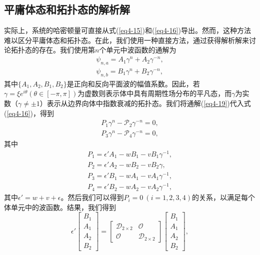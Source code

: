 \subsection{平庸体态和拓扑态的解析解}

实际上，系统的哈密顿量可直接从式(\ref{eq4-15})和(\ref{eq4-16})导出。然而，这种方法难以区分平庸体态和拓扑态。在此，我们使用一种直接方法，通过获得解析解来讨论拓扑态的存在。我们使用第\(n\)个单元中波函数的通解为\cite{i5}
\begin{equation}\label{eq4-19}
    \begin{split}
        \psi_{n,a}=A_{1}\gamma^{n}+A_{2}\gamma^{-n},\\
        \psi_{n,b}=B_{1}\gamma^{n}+B_{2}\gamma^{-n},
    \end{split}
\end{equation}
其中\(\{A_{1},A_{2},B_{1},B_{2}\}\)是正向和反向平面波的幅值系数。因此，若\(\gamma=\xi e^{i\theta}(\theta\in[-\pi,\pi])\)为虚数则表示体中具有周期性场分布的平凡态，而\(\gamma\)为实数（\(\gamma\neq\pm1\)）表示从边界向体中指数衰减的拓扑态。我们将通解(\ref{eq4-19})代入式(\ref{eq4-16})，得到
\begin{equation}\label{eq4-20}
    \begin{split}
        {P}_{1}\gamma^{n}-\mathcal{P}_{2}\gamma^{-n}=0,\\
        {P}_{3}\gamma^{n}-\mathcal{P}_{4}\gamma^{-n}=0,
    \end{split}
\end{equation}
其中
\begin{equation}\label{eq4-21}
    \begin{split}
        {P}_{1}=\epsilon'A_{1}-wB_{1}-vB_{1}\gamma^{-1},\\
        {P}_{2}=\epsilon'A_{2}-wB_{2}-vB_{2}\gamma,\\
        {P}_{3}=\epsilon'B_{1}-wA_{1}-vA_{1}\gamma^{-1},\\
        {P}_{4}=\epsilon'B_{2}-wA_{2}-vA_{2}\gamma^{-1},
    \end{split}
\end{equation}
其中\(\epsilon' = w + v + \epsilon\)。然后我们可以得到\({P}_{i}=0\ (i = 1,2,3,4)\)的关系，以满足每个体单元中的波函数。结果，我们得到
\begin{equation}\label{eq4-22}
    \epsilon'\begin{bmatrix}B_{1}\\A_{1}\\A_{2}\\B_{2}\end{bmatrix}=\begin{bmatrix}\mathcal{D}_{2\times2}&\mathcal{O}\\\mathcal{O}&\mathcal{D}_{2\times2}\end{bmatrix}\begin{bmatrix}B_{1}\\A_{1}\\A_{2}\\B_{2}\end{bmatrix},
\end{equation}
